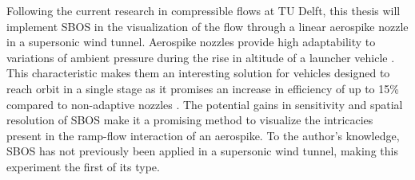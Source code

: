 \par Following the current research in compressible flows at TU Delft, this thesis will implement SBOS in the visualization of the flow through a linear aerospike nozzle in a supersonic wind tunnel. Aerospike nozzles provide high adaptability to variations of ambient pressure during the rise in altitude of a launcher vehicle \cite{Wisse2005}. This characteristic makes them an interesting solution for vehicles designed to reach orbit in a single stage as it promises an increase in efficiency of up to 15\% compared to non-adaptive nozzles \cite{Hagemann1998}. The potential gains in sensitivity and spatial resolution of SBOS make it a promising method to visualize the intricacies present in the ramp-flow interaction of an aerospike. To the author's knowledge, SBOS has not previously been applied in a supersonic wind tunnel, making this experiment the first of its type.

